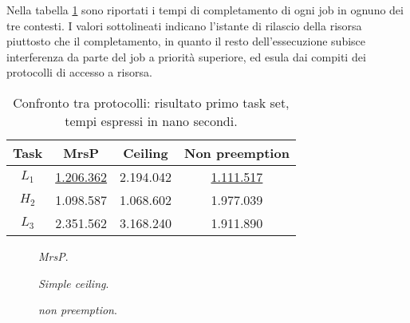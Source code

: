 \noindent Nella tabella \ref{tab:test_protocols_Taskset1_ris} sono riportati i tempi di completamento di ogni job in ognuno dei tre contesti. I valori sottolineati indicano l'istante di rilascio della risorsa piuttosto che il completamento, in quanto il resto dell'essecuzione subisce interferenza da parte del job a priorità superiore, ed esula dai compiti dei protocolli di accesso a risorsa.\\

\begin{table}
  \centering
  \begin{tabular}{cccc}
  \hline\hline
    Task & MrsP & Ceiling & Non preemption \\ \hline
    $L_1$ & \underline{1.206.362} & 2.194.042 & \underline{1.111.517} \\
    $H_2$ & 1.098.587 & 1.068.602 & 1.977.039 \\
    $L_3$ & 2.351.562 & 3.168.240 & 1.911.890 \\
    \hline
    \end{tabular}
  \caption{Confronto tra protocolli: risultato primo task set, tempi espressi in nano secondi.}
  \label{tab:test_protocols_Taskset1_ris}
\end{table}

    \begin{figure}
      \centering
      \RisultatoUnoMrsP
      \caption{\textit{MrsP}.}
      \label{fig:test_protocols_mrsp}
    \end{figure}

    \begin{figure}
      \centering
      \RisultatoUnoCeiling
      \caption{\textit{Simple ceiling}.}
      \label{fig:test_protocols_sc}
    \end{figure}
    
    \begin{figure}
      \centering
      \RisultatoUnoNoPreempion
      \caption{\textit{non preemption}.}
      \label{fig:test_protocols_np}
    \end{figure}

